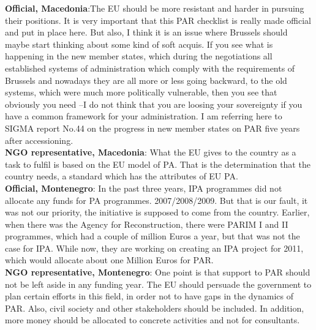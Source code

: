 \textbf{Official, Macedonia}:The EU should be more resistant and harder in pursuing their positions. It is very important that this PAR checklist is really made official and put in place here. But also, I think it is an issue where Brussels should maybe start thinking about some kind of soft acquis. If you see what is happening in the new member states, which during the negotiations all established systems of administration which comply with the requirements of Brussels and nowadays they are all more or less going backward, to the old systems, which were much more politically vulnerable, then you see that obviously you need –I do not think that you are loosing your sovereignty if you have a common framework for your administration. I am referring here to SIGMA report No.44 on the progress in new member states on PAR five years after accessioning. \\
\textbf{NGO representative, Macedonia}: What the EU gives to the country as a task to fulfil is based on the EU model of PA. That is the determination that the country needs, a standard which has the attributes of EU PA. \\
\textbf{Official, Montenegro}: In the past three years, IPA programmes did not allocate any funds for PA programmes. 2007/2008/2009. But that is our fault, it was not our priority, the initiative is supposed to come from the country. Earlier, when there was the Agency for Reconstruction, there were PARIM I and II programmes, which had a couple of million Euros a year, but that was not the case for IPA. While now, they are working on creating an IPA project for 2011, which would allocate about one Million Euros for PAR.  \\
\textbf{NGO representative, Montenegro}: One point is that support to PAR should not be left aside in any funding year. The EU should persuade the government to plan certain efforts in this field, in order not to have gaps in the dynamics of  PAR. Also, civil society and other stakeholders should be included. In addition, more money should be allocated to concrete activities and not for consultants.%
